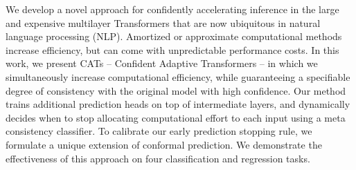 We develop a novel approach for confidently accelerating inference in the large and expensive multilayer Transformers that are now ubiquitous in natural language processing (NLP). Amortized or approximate computational methods increase efficiency, but can come with unpredictable performance costs. In this work, we present CATs -- Confident Adaptive Transformers -- in which we simultaneously increase computational efficiency, while guaranteeing a specifiable degree of consistency with the original model with high confidence. Our method trains additional prediction heads on top of intermediate layers, and dynamically decides when to stop allocating computational effort to each input using a meta consistency classifier. To calibrate our early prediction stopping rule, we formulate a unique extension of conformal prediction. We demonstrate the effectiveness of this approach on four classification and regression tasks.
